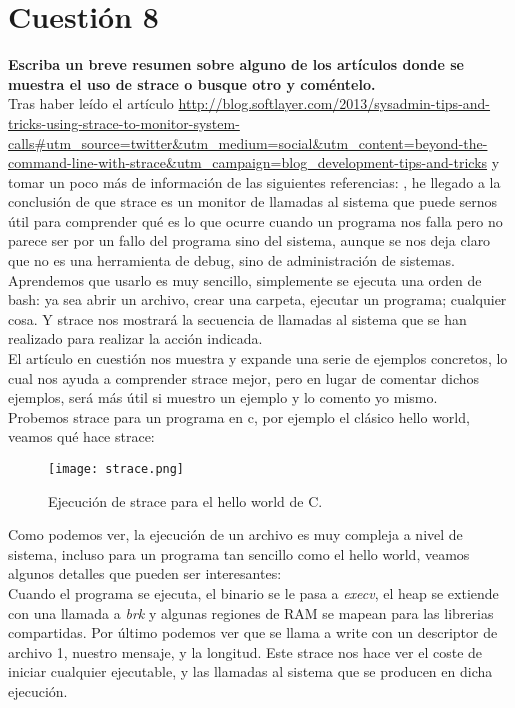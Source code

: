 \documentclass[a4paper, 11pt]{article} %
\begin{document}
\section{Cuestión 8}
\textbf{Escriba un breve resumen sobre alguno de los artículos donde se muestra el uso de strace o busque otro y coméntelo.}\\

Tras haber leído el artículo \url{http://blog.softlayer.com/2013/sysadmin-tips-and-tricks-using-strace-to-monitor-system-calls#utm_source=twitter&utm_medium=social&utm_content=beyond-the-command-line-with-strace&utm_campaign=blog_development-tips-and-tricks} y tomar un poco más de información de las siguientes referencias: \cite{18} \cite{19}, he llegado a la conclusión de que strace es un monitor de llamadas al sistema que puede sernos útil para comprender qué es lo que ocurre cuando un programa nos falla pero no parece ser por un fallo del programa sino del sistema, aunque se nos deja claro que no es una herramienta de debug, sino de administración de sistemas.\\
Aprendemos que usarlo es muy sencillo, simplemente se ejecuta una orden de bash: ya sea abrir un archivo, crear una carpeta, ejecutar un programa; cualquier cosa. Y strace nos mostrará la secuencia de llamadas al sistema que se han realizado para realizar la acción indicada.\\
El artículo en cuestión nos muestra y expande una serie de ejemplos concretos, lo cual nos ayuda a comprender strace mejor, pero en lugar de comentar dichos ejemplos, será más útil si muestro un ejemplo y lo comento yo mismo.\\
Probemos strace para un programa en c, por ejemplo el clásico hello world, veamos qué hace strace:
\begin{figure}[H]
\centering 
\texttt{[image: strace.png]} 
\caption{Ejecución de strace para el hello world de C.} 
\label{contexto:figura} 
\end{figure}

Como podemos ver, la ejecución de un archivo es muy compleja a nivel de sistema, incluso para un programa tan sencillo como el hello world, veamos algunos detalles que pueden ser interesantes:\\
Cuando el programa se ejecuta, el binario se le pasa a \textit{execv}, el heap se extiende con una llamada a \textit{brk} y algunas regiones de RAM se mapean para las librerias compartidas. Por último podemos ver que se llama a write con un descriptor de archivo 1, nuestro mensaje, y la longitud. Este strace nos hace ver el coste de iniciar cualquier ejecutable, y las llamadas al sistema que se producen en dicha ejecución.
\end{document}
